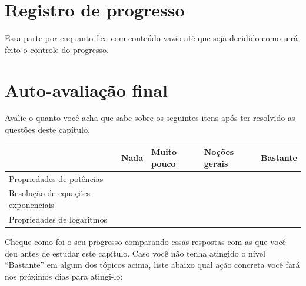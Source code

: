 \documentclass[main.tex]{subfiles}
\begin{document}
\paraFolhaAvaliacoes

\section{Registro de progresso}

Essa parte por enquanto fica com conteúdo vazio até que seja decidido como será feito o controle do progresso.

\section{Auto-avaliação final}
Avalie o quanto você acha que sabe sobre os seguintes itens após ter resolvido as questões deste capítulo.

\begin{center}
 \begin{tabular}{|p{35mm}||p{15mm}|p{15mm}|p{15mm}|p{15mm}|} 
 \hline
   & Nada & Muito pouco & Noções gerais & Bastante\\
 \hline
 Propriedades de potências &  &  &  &  \\ 
 \hline
 Resolução de equações exponenciais&  &  &  &  \\
 \hline
 Propriedades de logaritmos &  &  &  &  \\
 \hline
\end{tabular}
\end{center}

Cheque como foi o seu progresso comparando essas respostas com as que você deu antes de estudar este capítulo. Caso você não tenha atingido o nível ``Bastante''  em algum dos tópicos acima, liste abaixo qual ação concreta você fará nos próximos dias para atingi-lo:

\paraAmbos
\end{document}
